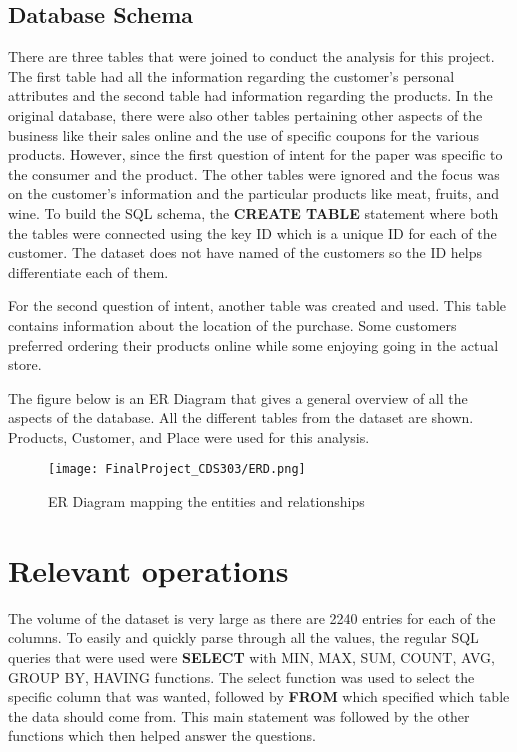 \documentclass{article}
\begin{document}
\subsection{ Database Schema }

There are three tables that were joined to conduct the analysis for this project. The first table had all the information regarding the customer's personal attributes and the second table had information regarding the products. In the original database, there were also other tables pertaining other aspects of the business like their sales online and the use of specific coupons for the various products. However, since the first question of intent for the paper was specific to the consumer and the product. The other tables were ignored and the focus was on the customer's information and the particular products like meat, fruits, and wine. 
To build the SQL schema, the \textbf{CREATE TABLE} statement where both the tables were connected using the key ID which is a unique ID for each of the customer. The dataset does not have named of the customers so the ID helps differentiate each of them. 

For the second question of intent, another table was created and used. This table contains information about the location of the purchase. Some customers preferred ordering their products online while some enjoying going in the actual store. 

The figure below is an ER Diagram that gives a general overview of all the aspects of the database. All the different tables from the dataset are shown. Products, Customer, and Place were used for this analysis.
\begin{figure}[htp]
    \centering
    \texttt{[image: FinalProject\_CDS303/ERD.png]}
    \caption{ER Diagram mapping the entities and relationships }
    \label{fig:galaxy}
\end{figure}


\section{Relevant operations}

The volume of the dataset is very large as there are 2240 entries for each of the columns. To easily and quickly parse through all the values, the regular SQL queries that were used were \textbf{SELECT} with MIN, MAX, SUM, COUNT, AVG, GROUP BY, HAVING functions. The select function was used to select the specific column that was wanted, followed by \textbf{FROM} which specified which table the data should come from. This main statement was followed by the other functions which then helped answer the questions. 
\end{document}
